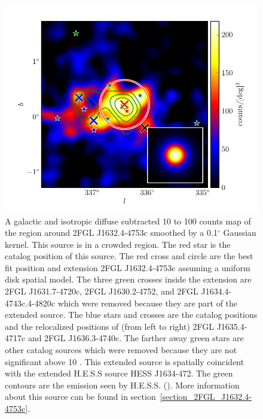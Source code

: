 \documentclass[12pt,preprint]{aastex}
\newcommand{\gev}{\text{GeV}\xspace}
\newcommand{\tev}{\text{TeV}\xspace}
\renewcommand{\deg}{\ensuremath{^\circ}\xspace}
\begin{document}
\begin{figure}
  \begin{center}
    \includegraphics[type=pdf,ext=.pdf,read=.pdf]{source_plots/source_1FGL_J1632.9-4802c}
  \end{center}
  \caption{A galactic and isotropic diffuse subtracted 10 \gev to 100
  \gev counts map of the region around 2FGL J1632.4-4753c smoothed by
  a 0.1\deg Gaussian kernel.  This source is in a crowded region.
  The red star is the catalog position of this source.  The red
  cross and circle are the best fit position and extension 2FGL
  J1632.4-4753c assuming a uniform disk spatial model.  The three
  green crosses inside the extension are 2FGL
  J1631.7-4720c, 2FGL J1630.2-4752, and 2FGL J1634.4-4743c.4-4820c
  which were removed because they are part
  of the extended source.  The blue stars and crosses are the catalog
  positions and the relocalized positions of (from left to right)
  2FGL J1635.4-4717c and 2FGL J1636.3-4740c.  The farther away green
  stars are other catalog sources which were removed 
  because they are not significant
  above 10 \gev.  This extended source is spatially coincident
  with the extended H.E.S.S source HESS J1634-472.  The green
  contours are the \tev emission seen by H.E.S.S. 
  (\cite{HESS_plane_survey}). More information about this source 
  can be found in section~\ref{section_2FGL_J1632.4-4753c}.
  }\label{1FGL_J1632.9-4802c}
\end{figure}
\end{document}
